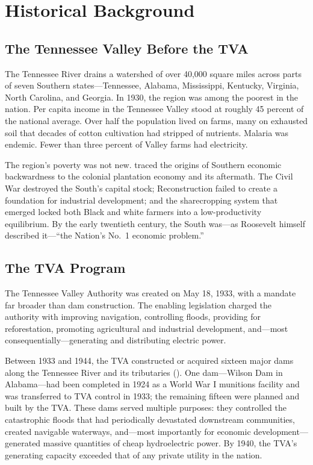 \documentclass[12pt]{article}
\begin{document}
\section{Historical Background}\label{sec:background}

\subsection{The Tennessee Valley Before the TVA}

The Tennessee River drains a watershed of over 40,000 square miles across parts of seven Southern states---Tennessee, Alabama, Mississippi, Kentucky, Virginia, North Carolina, and Georgia. In 1930, the region was among the poorest in the nation. Per capita income in the Tennessee Valley stood at roughly 45 percent of the national average. Over half the population lived on farms, many on exhausted soil that decades of cotton cultivation had stripped of nutrients. Malaria was endemic. Fewer than three percent of Valley farms had electricity.

The region's poverty was not new. \citet{woodward1951} traced the origins of Southern economic backwardness to the colonial plantation economy and its aftermath. The Civil War destroyed the South's capital stock; Reconstruction failed to create a foundation for industrial development; and the sharecropping system that emerged locked both Black and white farmers into a low-productivity equilibrium. By the early twentieth century, the South was---as Roosevelt himself described it---``the Nation's No.\ 1 economic problem.''

\subsection{The TVA Program}

The Tennessee Valley Authority was created on May 18, 1933, with a mandate far broader than dam construction. The enabling legislation charged the authority with improving navigation, controlling floods, providing for reforestation, promoting agricultural and industrial development, and---most consequentially---generating and distributing electric power.

Between 1933 and 1944, the TVA constructed or acquired sixteen major dams along the Tennessee River and its tributaries (). One dam---Wilson Dam in Alabama---had been completed in 1924 as a World War I munitions facility and was transferred to TVA control in 1933; the remaining fifteen were planned and built by the TVA. These dams served multiple purposes: they controlled the catastrophic floods that had periodically devastated downstream communities, created navigable waterways, and---most importantly for economic development---generated massive quantities of cheap hydroelectric power. By 1940, the TVA's generating capacity exceeded that of any private utility in the nation.
\end{document}
